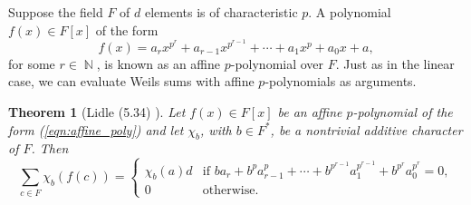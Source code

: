 \documentclass[a4paper, 11pt]{article}
\DeclareMathOperator{\N}{\mathbb{N}}
\newtheorem{theorem}{Theorem}
\begin{document}
  Suppose the field $F$ of $d$ elements is of characteristic
  $p$. A polynomial $f(x) \in F[x]$ of the form
  \begin{equation}
    \label{eqn:affine_poly}
    f(x)
    = a_r x^{p^{r}} + a_{r-1} x^{p^{r-1}} + \cdots + a_1
    x^{p} + a_0 x + a,
  \end{equation}
  for some $r \in \N$, is known as an affine $p$-polynomial
  over $F$. Just as in the linear case, we can evaluate
  Weils sums with affine $p$-polynomials as arguments.
  \begin{theorem}[Lidle (5.34) \cite{lidl1997}]
    \label{thm:lidl_2}
    Let $f(x) \in F[x]$ be an affine $p$-polynomial of the
    form (\ref{eqn:affine_poly}) and let $\chi_b$, with $b
    \in F^{*}$, be a nontrivial additive character of $F$.
    Then
    \begin{equation}
      \sum_{c \in F}^{} 
      \chi_b\left( f(c) \right) 
      = \begin{cases}
        \chi_b(a) d
        & \text{if } ba_r + b^{p}a^{p}_{r-1} + \cdots +
        b^{p^{r-1}}a^{p^{r-1}}_1 + b^{p^{r}}a^{p^{r}}_0 = 0,
        \\
        0 & \text{otherwise.}
      \end{cases}
    \end{equation}
  \end{theorem}
\end{document}
